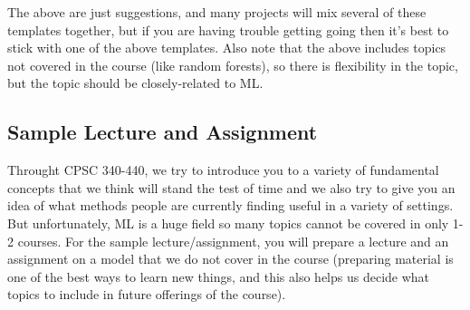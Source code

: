 \documentclass{article}
\def\blu#1{{\color{blu}#1}}
\begin{document}
The above are just suggestions, and many projects will mix several of these templates together, but if you are having trouble getting going then it's best to stick with one of the above templates. Also note that the above includes topics not covered in the course (like random forests), so there is flexibility in the topic, but the topic should be closely-related to ML.


\subsection*{Sample Lecture and Assignment}

 Throught CPSC 340-440, we try to introduce you to a variety of fundamental concepts that we think will stand the test of time and we also try to give you an idea of what methods people are currently finding useful in a variety of settings. But unfortunately, ML is a huge field so many topics cannot be covered in only 1-2 courses. For the sample lecture/assignment, you will \blu{prepare a lecture and an assignment on a model that we do not cover in the course} (preparing material is one of the best ways to learn new things, and this also helps us decide what topics to include in future offerings of the course).
\end{document}

